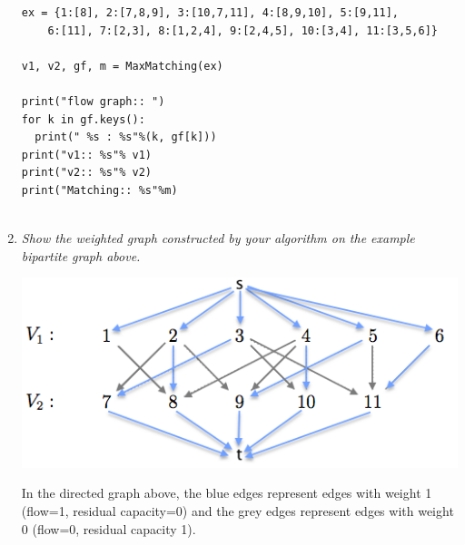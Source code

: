 \documentclass[12pt]{article} \setlength{\oddsidemargin}{0in}
\begin{document}
\begin{enumerate}
\begin{verbatim}
ex = {1:[8], 2:[7,8,9], 3:[10,7,11], 4:[8,9,10], 5:[9,11], 
    6:[11], 7:[2,3], 8:[1,2,4], 9:[2,4,5], 10:[3,4], 11:[3,5,6]}

v1, v2, gf, m = MaxMatching(ex)

print("flow graph:: ")
for k in gf.keys():
  print(" %s : %s"%(k, gf[k]))
print("v1:: %s"% v1)
print("v2:: %s"% v2)
print("Matching:: %s"%m)


\end{verbatim}
\newpage

\item\textit{Show the weighted graph constructed by your algorithm on the example bipartite graph above.}

\includegraphics{p1c}

In the directed graph above, the blue edges represent edges with weight 1 (flow=1, residual capacity=0) and the grey edges represent edges with weight 0 (flow=0, residual capacity 1).

\end{enumerate}
\end{document}
